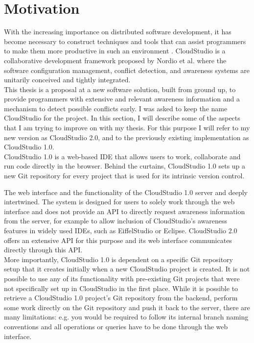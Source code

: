 \section{Motivation}




With the increasing importance on distributed software development, it has become necessary to construct techniques and tools that can assist programmers to make them more productive in such an environment \cite{ref13}. CloudStudio is a collaborative development framework proposed by Nordio et al. \cite{ref12, ref28} where the software configuration management, conflict detection, and awareness systems are unitarily conceived and tightly integrated. \\

This thesis is a proposal at a new software solution, built from ground up, to provide programmers with extensive and relevant awareness information and a mechanism to detect possible conflicts early. I was asked to keep the name CloudStudio for the project. In this section, I will describe some of the aspects that I am trying to improve on with my thesis. For this purpose I will refer to my new version as CloudStudio 2.0, and to the previously existing implementation as CloudStudio 1.0. \\

CloudStudio 1.0 is a web-based IDE that allows users to work, collaborate and run code directly in the browser. Behind the curtains, CloudStudio 1.0 sets up a new Git repository for every project that is used for its intrinsic version control.

The web interface and the functionality of the CloudStudio 1.0 server and deeply intertwined. The system is designed for users to solely work through the web interface and does not provide an API to directly request awareness information from the server, for example to allow inclusion of CloudStudio's awareness features in widely used IDEs, such as EiffelStudio \cite{eiffelstudio} or Eclipse. CloudStudio 2.0 offers an extensive API for this purpose and its web interface communicates directly through this API. \\

More importantly, CloudStudio 1.0 is dependent on a specific Git repository setup that it creates initially when a new CloudStudio project is created. It is not possible to use any of its functionality with pre-existing Git projects that were not specifically set up in CloudStudio in the first place. While it is possible to retrieve a CloudStudio 1.0 project's Git repository from the backend, perform some work directly on the Git repository and push it back to the server, there are many limitations: e.g. you would be required to follow its internal branch naming conventions and all operations or queries have to be done through the web interface. \\

